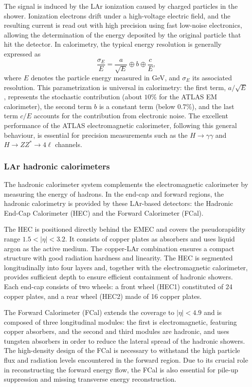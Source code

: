 The signal is induced by the LAr ionization caused by charged particles in the shower. Ionization electrons drift under a high-voltage electric field, and the resulting current is read out with high precision using fast low-noise electronics, allowing the determination of the energy deposited by the original particle that hit the detector. In calorimetry, the typical energy resolution is generally expressed as
\begin{equation}
\frac{\sigma_E}{E} = \frac{a}{\sqrt{E}} \oplus b \oplus \frac{c}{E},
\end{equation}
where $E$ denotes the particle energy measured in GeV, and $\sigma_E$ its associated resolution. This parametrization is universal in calorimetry: the first term, $a/\sqrt{E}$, represents the stochastic contribution (about $10\%$ for the ATLAS EM calorimeter), the second term $b$ is a constant term (below $0.7\%$), and the last term $c/E$ accounts for the contribution from electronic noise. The excellent performance of the ATLAS electromagnetic calorimeter, following this general behaviour, is essential for precision measurements such as the $H \rightarrow \gamma\gamma$ and $H \rightarrow ZZ^* \rightarrow 4\ell$ channels.

\subsubsection{LAr hadronic calorimeters}
\label{sec:elehad}

The hadronic calorimeter system complements the electromagnetic calorimeter by measuring the energy of hadrons. In the end-cap and forward regions, the hadronic calorimetry is provided by these LAr-based detectors: the Hadronic End-Cap Calorimeter (HEC) and the Forward Calorimeter (FCal).

The HEC is positioned directly behind the EMEC and covers the pseudorapidity range $1.5 < |\eta| < 3.2$. It consists of copper plates as absorbers and uses liquid argon as the active medium. The copper-LAr combination ensures a compact structure with good radiation hardness and linearity. The HEC is segmented longitudinally into four layers and, together with the electromagnetic calorimeter, provides sufficient depth to ensure efficient containment of hadronic showers. Each end-cap consists of two wheels: a front wheel (HEC1) constituted of 24 copper plates, and a rear wheel (HEC2) made of 16 copper plates.

The Forward Calorimeter (FCal) extends the coverage to $|\eta| < 4.9$ and is composed of three longitudinal modules: the first is electromagnetic, featuring copper absorbers, and the second and third modules are hadronic, and uses tungsten absorbers in order to reduce the lateral spread of the hadronic showers. The high-density design of the FCal is necessary to withstand the high particle flux and radiation levels encountered in the forward region. Due to its crucial role in reconstructing the forward energy flow, the FCal is also essential for pile-up suppression and missing transverse energy reconstruction.

